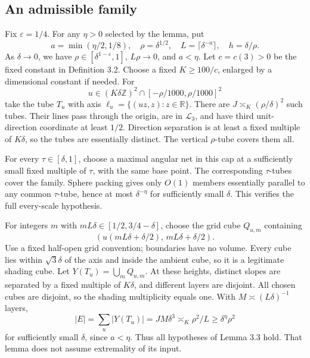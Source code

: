 \documentclass[10pt]{article}
\begin{document}
\subsection*{An admissible family}
Fix \(\varepsilon=1/4\). For any \(\eta>0\) selected by the lemma, put \[a=\min(\eta/2,1/8),\quad \rho=\delta^{1/2},\quad
 L=\lceil\delta^{-a}\rceil,\quad h=\delta/\rho.\] As \(\delta\to0\), we have \(\rho\in[\delta^{1-\varepsilon},1]\), \(L\rho\to0\), and \(a<\eta\). Let \(c=c(3)>0\) be the fixed constant in Definition 3.2. Choose a fixed \(K\ge100/c\), enlarged by a dimensional constant if needed. For \[u\in(K\delta\mathbb Z)^2\cap[-\rho/1000,\rho/1000]^2\] take the tube \(T_u\) with axis \(\ell_u=\{(uz,z):z\in\mathbb R\}\). There are \(J\asymp_K(\rho/\delta)^2\) such tubes. Their lines pass through the origin, are in \(\mathcal L_3\), and have third unit-direction coordinate at least \(1/2\). Direction separation is at least a fixed multiple of \(K\delta\), so the tubes are essentially distinct. The vertical \(\rho\)-tube covers them all.\par
For every \(\tau\in[\delta,1]\), choose a maximal angular net in this cap at a sufficiently small fixed multiple of \(\tau\), with the same base point. The corresponding \(\tau\)-tubes cover the family. Sphere packing gives only \(O(1)\) members essentially parallel to any common \(\tau\)-tube, hence at most \(\delta^{-\eta}\) for sufficiently small \(\delta\). This verifies the full every-scale hypothesis.\par
For integers \(m\) with \(mL\delta\in[1/2,3/4-\delta]\), choose the grid cube \(Q_{u,m}\) containing \[(u(mL\delta+\delta/2),\,mL\delta+\delta/2).\] Use a fixed half-open grid convention; boundaries have no volume. Every cube lies within \(\sqrt3\delta\) of the axis and inside the ambient cube, so it is a legitimate shading cube. Let \(Y(T_u)=\bigcup_m Q_{u,m}\). At these heights, distinct slopes are separated by a fixed multiple of \(K\delta\), and different layers are disjoint. All chosen cubes are disjoint, so the shading multiplicity equals one. With \(M\asymp(L\delta)^{-1}\) layers, \[|E|=\sum_u|Y(T_u)|=JM\delta^3\asymp_K\rho^2/L
 \ge\delta^\eta\rho^2\] for sufficiently small \(\delta\), since \(a<\eta\). Thus all hypotheses of Lemma 3.3 hold. That lemma does not assume extremality of its input.\par
\end{document}
